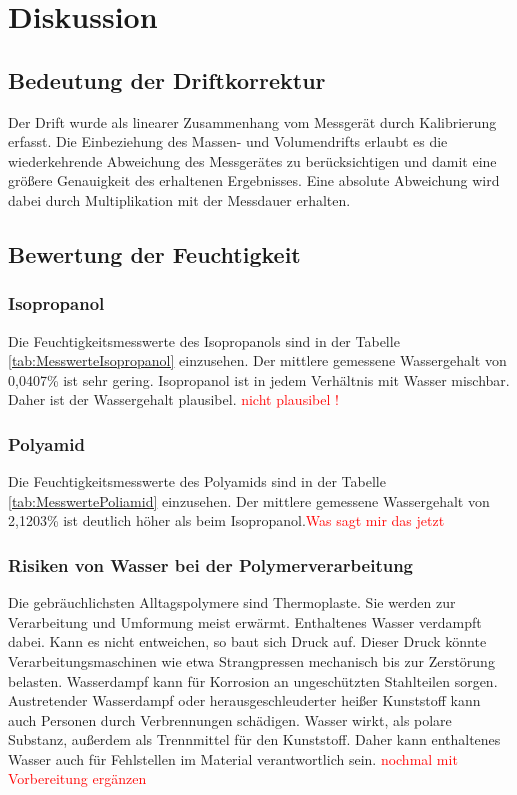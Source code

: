 \section{Diskussion}
\label{sec:diskussion}


\subsection{Bedeutung der Driftkorrektur}
Der Drift wurde als linearer Zusammenhang vom Messgerät durch Kalibrierung erfasst. Die Einbeziehung des Massen- und Volumendrifts erlaubt es die wiederkehrende Abweichung des Messgerätes zu berücksichtigen und damit eine größere Genauigkeit des erhaltenen Ergebnisses. Eine absolute Abweichung wird dabei durch Multiplikation mit der Messdauer erhalten.

\subsection{Bewertung der Feuchtigkeit}

\subsubsection{Isopropanol}
Die Feuchtigkeitsmesswerte des Isopropanols sind in der Tabelle \ref{tab:MesswerteIsopropanol} einzusehen. Der mittlere gemessene Wassergehalt von 0,0407\% ist sehr gering. Isopropanol ist in jedem Verhältnis mit Wasser mischbar.\cite{isopropanol} Daher ist der Wassergehalt plausibel. 
\textcolor{red}{nicht plausibel !}

\subsubsection{Polyamid}
Die Feuchtigkeitsmesswerte des Polyamids sind in der Tabelle \ref{tab:MesswertePoliamid} einzusehen. Der mittlere gemessene Wassergehalt von 2,1203\% ist deutlich höher als beim Isopropanol.\textcolor{red}{Was sagt mir das jetzt} 

\subsubsection{Risiken von Wasser bei der Polymerverarbeitung}
Die gebräuchlichsten Alltagspolymere sind Thermoplaste. Sie werden zur Verarbeitung und Umformung meist erwärmt. Enthaltenes Wasser verdampft dabei. Kann es nicht entweichen, so baut sich Druck auf. Dieser Druck könnte Verarbeitungsmaschinen wie etwa Strangpressen mechanisch bis zur Zerstörung belasten. Wasserdampf kann für Korrosion an ungeschützten Stahlteilen sorgen. Austretender Wasserdampf oder herausgeschleuderter heißer Kunststoff kann auch Personen durch Verbrennungen schädigen. Wasser wirkt, als polare Substanz, außerdem als Trennmittel für den Kunststoff. Daher kann enthaltenes Wasser auch für Fehlstellen im Material verantwortlich sein.
\textcolor{red}{nochmal mit Vorbereitung ergänzen}